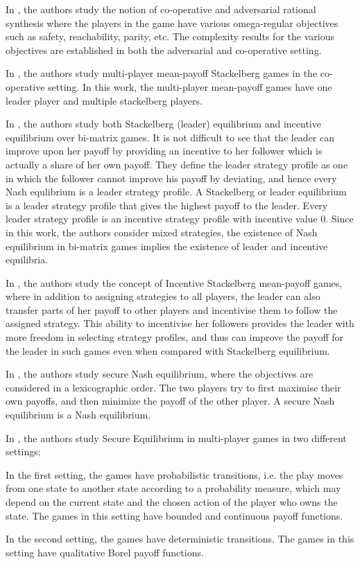 In \cite{CFGR16}, the authors study the notion of co-operative and adversarial rational synthesis where the players in the game have various omega-regular objectives such as safety, reachability, parity, etc. The complexity results for the various objectives are established in both the adversarial and co-operative setting. 

In \cite{GS14}, the authors study multi-player mean-payoff Stackelberg games in the co-operative setting. In this work, the multi-player mean-payoff games have one leader player and multiple stackelberg players.

In \cite{GS18}, the authors study both Stackelberg (leader) equilibrium and incentive equilibrium over bi-matrix games. It is not difficult to see that the leader can improve upon her payoff by providing an incentive to her follower which is actually a share of her own payoff. They define the leader strategy profile as one in which the follower cannot improve his payoff by deviating, and hence every Nash equlibrium is a leader strategy profile. A Stackelberg or leader equilibrium is a leader strategy profile that gives the highest payoff to the leader. Every leader strategy profile is an incentive strategy profile with incentive value $0$. Since in this work, the authors consider mixed strategies, the existence of Nash equilibrium in bi-matrix games \cite{Nash50,LH64} implies the existence of leader and incentive equilibria.

In \cite{GSTDP16}, the authors study the concept of Incentive Stackelberg mean-payoff games, where in addition to assigning strategies to all players, the leader can also transfer parts of her payoff to other players and incentivise them to follow the assigned strategy. This ability to incentivise her followers provides the leader with more freedom in selecting strategy profiles, and thus can improve the payoff for the leader in such games even when compared with Stackelberg equilibrium.

In \cite{CHJ06}, the authors study secure Nash equilibrium, where the objectives are considered in a lexicographic order. The two players try to first maximise their own payoffs, and then minimize the payoff of the other player. A secure Nash equilibrium is a Nash equilibrium. 

In \cite{PFKSV14}, the authors study Secure Equilibrium in multi-player games in two different settings: 
\begin{inparaenum}[(i)]
    \item In the first setting, the games have probabilistic transitions, i.e. the play moves from one state to another state according to a probability measure, which may depend on the current state and the chosen action of the player who owns the state. The games in this setting have bounded and continuous payoff functions.
    \item In the second setting, the games have deterministic transitions. The games in this setting have qualitative Borel payoff functions.
\end{inparaenum}

